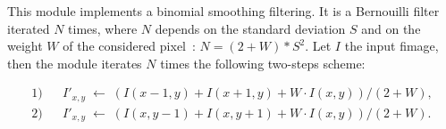 
This module implements a binomial smoothing filtering. 
It is a Bernouilli filter iterated $N$ times, where
$N$ depends on the standard deviation $S$ and on the weight $W$ 
of the considered pixel~: $N=(2+W)*S^{2}$. 
Let $I$ the input fimage, then the module iterates $N$ times
the following two-steps scheme:

\begin{eqnarray*}
1) && I'_{x,y} \;\longleftarrow\; (I(x-1,y)+I(x+1,y)+W\cdot I(x,y))/(2+W), \\
2) && I'_{x,y} \;\longleftarrow\; (I(x,y-1)+I(x,y+1)+W\cdot I(x,y))/(2+W).
\end{eqnarray*}

